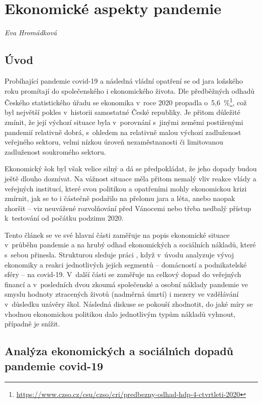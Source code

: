 
\chapter{Ekonomick\'{e} aspekty pandemie} \label{Ekonomicke_aspekty}

\textit{Eva Hromádková}
\vspace{15mm}

\section*{\'{U}vod} 
Probíhající pandemie covid-19 a následná vládní opatření se od jara loňského roku promítají do společenského i ekonomického života. Dle předběžných odhadů Českého statistického úřadu se ekonomika v~roce 2020 propadla o~5,6~\%\footnote{\url{https://www.czso.cz/csu/czso/cri/predbezny-odhad-hdp-4-ctvrtleti-2020}}, což byl největší pokles v~historii samostatné České republiky. Je přitom důležité zmínit, že její výchozí situace byla v~porovnání s~jinými zeměmi postiženými pandemií relativně dobrá, s~ohledem na relativně malou výchozí zadluženost veřejného sektoru, velmi nízkou úroveň nezaměstnanosti či limitovanou zadluženost soukromého sektoru. 

Ekonomický šok byl však velice silný a dá se předpokládat, že jeho dopady budou ještě dlouho doznívat. Na vážnost situace měla přitom nemalý vliv reakce vlády a veřejných institucí, které svou politikou a opatřeními mohly ekonomickou krizi zmírnit, jak se to i částečně podařilo na přelomu jara a léta, anebo naopak zhoršit -- viz neuvážené rozvolňování před Vánocemi nebo třeba nedbalý přístup k~testování od počátku podzimu 2020.

Tento článek se ve své hlavní části zaměřuje na popis ekonomické situace v~prů\-bě\-hu pandemie a na hrubý odhad ekonomických a sociálních nákladů, které s~sebou přinesla. Strukturou sleduje práci \cite{Levy2021}, když v~úvodu analyzuje vývoj ekonomiky a reakci jednotlivých jejích segmentů – domácností a podnikatelské sféry – na covid-19. V~další části se zaměřuje na celkový dopad do veřejných financí a v~posledních dvou zkoumá společenské a osobní náklady pandemie ve smyslu hodnoty ztracených životů (nadměrná úmrtí) i mezery ve vzdělávání v~důsledku uzávěry škol. Následná diskuse se pokouší zhodnotit, do jaké míry se vhodnou ekonomickou politikou dalo jednotlivým typům nákladů vyhnout, případně je snížit.

\section*{Anal\'{y}za ekonomick\'{y}ch a soci\'{a}ln\'{\i}ch dopad\r{u} pandemie covid-19} 

